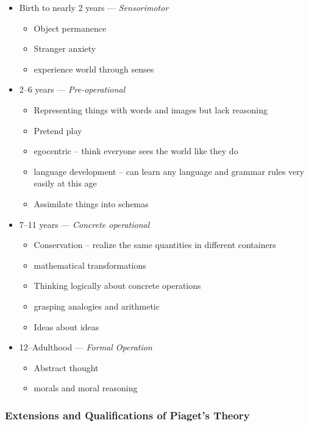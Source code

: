 \documentclass[12pt]{article}
\begin{document}
\begin{itemize}
    \item Birth to nearly 2 years --- \textit{Sensorimotor}
        \begin{itemize}
            \item Object permanence
            \item Stranger anxiety
            \item experience world through senses
        \end{itemize}
    \item 2--6 years --- \textit{Pre-operational}
        \begin{itemize}
            \item Representing things with words and images but lack reasoning
            \item Pretend play
            \item egocentric -- think everyone sees the world like they do
            \item language development -- can learn any language and grammar
                rules very easily at this age
            \item Assimilate things into schemas
        \end{itemize}
    \item 7--11 years --- \textit{Concrete operational}
        \begin{itemize}
            \item Conservation -- realize the same quantities in different
                containers
            \item mathematical transformations
            \item Thinking logically about concrete operations
            \item grasping analogies and arithmetic
            \item Ideas about ideas
        \end{itemize}
    \item 12--Adulthood --- \textit{Formal Operation}
        \begin{itemize}
            \item Abstract thought
            \item morals and moral reasoning
        \end{itemize}
\end{itemize}


\subsubsection{ Extensions and Qualifications of Piaget's Theory}
\end{document}
